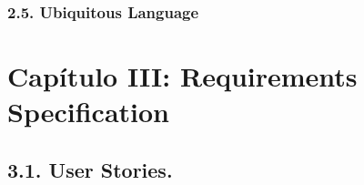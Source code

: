 \subsubsection{2.5. Ubiquitous
Language}\label{report__20-cap2-requirements-analysis.md__ubiquitous-language}

\section{Capítulo III: Requirements
Specification}\label{report__30-cap3-requirements-spec.md__capuxedtulo-iii-requirements-specification}

\subsection{3.1. User
Stories.}\label{report__30-cap3-requirements-spec.md__user-stories.}

